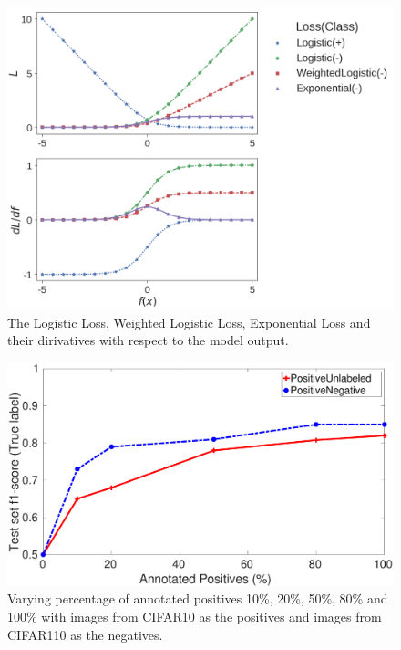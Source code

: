 \begin{figure}[t]
\centering
   \includegraphics[width=1.05\linewidth]{img/losses}
\caption{The Logistic Loss, Weighted Logistic Loss, Exponential Loss and their dirivatives with respect to the model output.}
\label{fig:losses}
\end{figure}


\begin{figure}[t]
\centering
   \includegraphics[width=\linewidth]{img/pu_vs_pn}
\caption{Varying percentage of annotated positives 10\%, 20\%, 50\%, 80\% and 100\% with images from CIFAR10 as the positives and images from CIFAR110 as the negatives.}
\label{fig:pct_annotating}
\end{figure}

